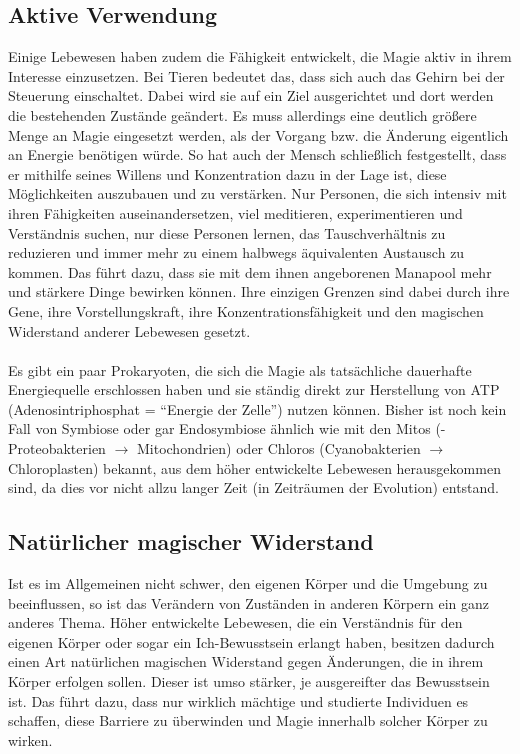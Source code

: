 \subsection{Aktive Verwendung}
Einige Lebewesen haben zudem die Fähigkeit entwickelt, die Magie aktiv in ihrem Interesse einzusetzen.
Bei Tieren bedeutet das, dass sich auch das Gehirn bei der Steuerung einschaltet.
Dabei wird sie auf ein Ziel ausgerichtet und dort werden die bestehenden Zustände geändert.
Es muss allerdings eine deutlich größere Menge an Magie eingesetzt werden, als der Vorgang bzw. die Änderung eigentlich an Energie benötigen würde.
So hat auch der Mensch schließlich festgestellt, dass er mithilfe seines Willens und Konzentration dazu in der Lage ist, diese Möglichkeiten auszubauen und zu verstärken.
Nur Personen, die sich intensiv mit ihren Fähigkeiten auseinandersetzen, viel meditieren, experimentieren und Verständnis suchen, nur diese Personen lernen, das Tauschverhältnis zu reduzieren und immer mehr zu einem halbwegs äquivalenten Austausch zu kommen.
Das führt dazu, dass sie mit dem ihnen angeborenen Manapool mehr und stärkere Dinge bewirken können.
Ihre einzigen Grenzen sind dabei durch ihre Gene, ihre Vorstellungskraft, ihre Konzentrationsfähigkeit und den magischen Widerstand anderer Lebewesen gesetzt. 
\\ \\
Es gibt ein paar Prokaryoten, die sich die Magie als tatsächliche dauerhafte Energiequelle erschlossen haben und sie ständig direkt zur Herstellung von ATP (Adenosintriphosphat = "`Energie der Zelle"') nutzen können.
Bisher ist noch kein Fall von Symbiose oder gar Endosymbiose ähnlich wie mit den Mitos (\textalpha-Proteobakterien $\rightarrow$ Mitochondrien) oder Chloros (Cyanobakterien $\rightarrow$ Chloroplasten) bekannt, aus dem höher entwickelte Lebewesen herausgekommen sind, da dies vor nicht allzu langer Zeit (in Zeiträumen der Evolution) entstand.


\subsection{Natürlicher magischer Widerstand}
Ist es im Allgemeinen nicht schwer, den eigenen Körper und die Umgebung zu beeinflussen, so ist das Verändern von Zuständen in anderen Körpern ein ganz anderes Thema.
Höher entwickelte Lebewesen, die ein Verständnis für den eigenen Körper oder sogar ein Ich-Bewusstsein erlangt haben, besitzen dadurch einen Art natürlichen magischen Widerstand gegen Änderungen, die in ihrem Körper erfolgen sollen. 
Dieser ist umso stärker, je ausgereifter das Bewusstsein ist.
Das führt dazu, dass nur wirklich mächtige und studierte Individuen es schaffen, diese Barriere zu überwinden und Magie innerhalb solcher Körper zu wirken.




